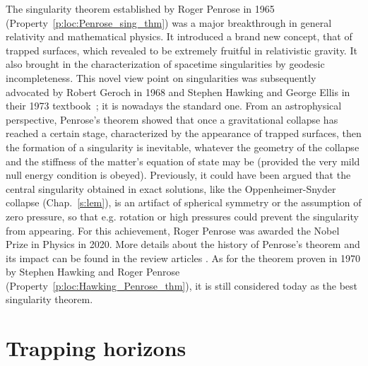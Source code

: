 \begin{hist}
The singularity theorem established by Roger Penrose
in 1965 \cite{Penro65} (Property~\ref{p:loc:Penrose_sing_thm})
was a major breakthrough in general relativity and mathematical physics.
It introduced a brand new concept, that of trapped surfaces, which revealed to
be extremely fruitful in relativistic gravity. It also brought in the characterization of
spacetime singularities by geodesic incompleteness. This novel view point on
singularities was subsequently advocated by Robert Geroch
in 1968 \cite{Geroc68} and Stephen Hawking and George Ellis in their 1973 textbook~\cite{HawkiE73}; it is nowadays the standard one. From an astrophysical perspective, Penrose's theorem showed that
once a gravitational collapse has reached a certain stage, characterized by the appearance
of trapped surfaces, then the formation of a singularity is inevitable, whatever the
geometry of the collapse and the stiffness of the matter's equation of state may be (provided
the very mild null energy condition is obeyed). Previously, it could have been
argued that the central singularity obtained in exact solutions, like the Oppenheimer-Snyder collapse (Chap.~\ref{s:lem}), is an artifact of spherical
symmetry or the assumption of zero pressure, so that e.g. rotation or high pressures could
prevent the singularity from appearing. For this achievement, Roger Penrose was awarded the Nobel Prize in Physics in 2020.
More details about the history of Penrose's theorem and its impact can be found
in the review articles \cite{Senov22a,Senov22b,SenovG15,Lands22}.
As for the theorem
proven in 1970 by Stephen Hawking  and
Roger Penrose \cite{HawkiP70} (Property~\ref{p:loc:Hawking_Penrose_thm}),
it is still considered today as the best singularity theorem.
\end{hist}



\section{Trapping horizons}


